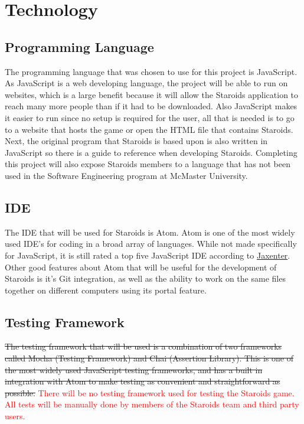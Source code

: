 \documentclass{article}
\begin{document}
\section{Technology}
\subsection{Programming Language}
The programming language that was chosen to use for this project is JavaScript. As JavaScript is a web developing language, the project will be able to run on websites, which is a large benefit because it will allow the Staroids application to reach many more people than if it had to be downloaded. Also JavaScript makes it easier to run since no setup is required for the user, all that is needed is to go to a website that hosts the game or open the HTML file that contains Staroids. Next, the original program that Staroids is based upon is also written in JavaScript so there is a guide to reference when developing Staroids. Completing this project will also expose Staroids members to a language that has not been used in the Software Engineering program at McMaster University.
\subsection{IDE}
\label{technology:ide}
The IDE that will be used for Staroids is Atom. Atom is one of the most widely used IDE’s for coding in a broad array of languages. While not made specifically for JavaScript, it is still rated a top five JavaScript IDE according to \href{https://jaxenter.com/top-5-javascript-ide-146609.html}{Jaxenter}. Other good features about Atom that will be useful for the development of Staroids is it’s Git integration, as well as the ability to work on the same files together on different computers using its portal feature.
\subsection{Testing Framework}
\sout{The testing framework that will be used is a combination of two frameworks called Mocha (Testing Framework) and Chai (Assertion Library). This is one of the most widely used JavaScript testing frameworks, and has a built in integration with Atom to make testing as convenient and straightforward as possible.}
\textcolor{red}{There will be no testing framework used for testing the Staroids game. All tests will be manually done by members of the Staroids team and third party users.}
\end{document}
